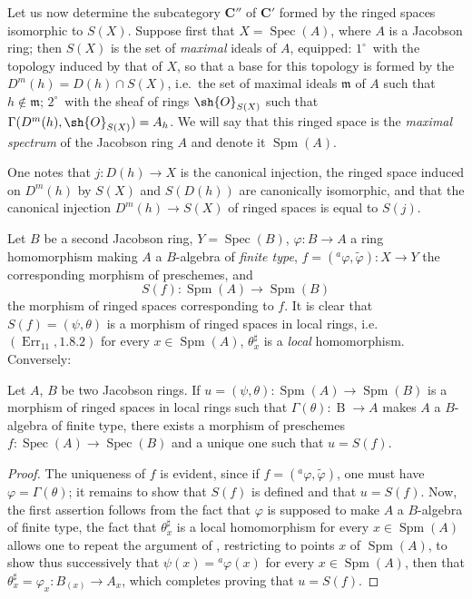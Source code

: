 \begin{env}[10.9.3]
\label{IV.10.9.3}
Let us now determine the subcategory $\mathbf{C}''$ of $\mathbf{C}'$ formed by the ringed spaces isomorphic to $S(X)$.
Suppose first that $X=\operatorname{Spec}(A)$, where $A$ is a Jacobson ring; then $S(X)$ is the set of \emph{maximal} ideals of $A$, equipped: $1^\circ$~with the topology induced by that of $X$, so that a base for this topology is formed by the $D^m(h)=D(h)\cap S(X)$, i.e.\ the set of maximal ideals $\mathfrak{m}$ of $A$ such that $h\notin\mathfrak{m}$; $2^\circ$~with the sheaf of rings $\sh{O}_{S(X)}$ such that $\Gamma(D^m(h),\sh{O}_{S(X)})=A_h$.
We will say that this ringed space is the \emph{maximal spectrum} of the Jacobson ring $A$ and denote it $\operatorname{Spm}(A)$.

One notes that $j:D(h)\to X$ is the canonical injection, the ringed space induced on $D^m(h)$ by $S(X)$ and $S(D(h))$ are canonically isomorphic, and that the canonical injection $D^m(h)\to S(X)$ of ringed spaces is equal to $S(j)$.

Let $B$ be a second Jacobson ring, $Y=\operatorname{Spec}(B)$, $\varphi:B\to A$ a ring homomorphism making $A$ a $B$-algebra of \emph{finite type}, $f=({}^a\varphi,\widetilde{\varphi}):X\to Y$ the corresponding morphism of preschemes, and
\[
  S(f):\operatorname{Spm}(A)\to\operatorname{Spm}(B)
\]
the morphism of ringed spaces corresponding to $f$.
It is clear that $S(f)=(\psi,\theta)$ is a morphism of ringed spaces in local rings, i.e.\ $(\operatorname{Err}_{11},1.8.2)$ for every $x\in\operatorname{Spm}(A)$, $\theta^\sharp_x$ is a \emph{local} homomorphism.
Conversely:
\end{env}

\begin{proposition}[10.9.4]
\label{IV.10.9.4}
Let $A$, $B$ be two Jacobson rings.
If $u=(\psi,\theta):\operatorname{Spm}(A)\to\operatorname{Spm}(B)$ is a morphism of ringed spaces in local rings such that $\Gamma(\theta):\operatorname{B}\to A$ makes $A$ a $B$-algebra of finite type, there exists a morphism of preschemes $f:\operatorname{Spec}(A)\to\operatorname{Spec}(B)$ and a unique one such that $u=S(f)$.
\end{proposition}

\begin{proof}
The uniqueness of $f$ is evident, since if $f=({}^a\varphi,\widetilde{\varphi})$, one must have $\varphi=\Gamma(\theta)$; it remains to show that $S(f)$ is defined and that $u=S(f)$.
Now, the first assertion follows from the fact that $\varphi$ is supposed to make $A$ a $B$-algebra of finite type, the fact that $\theta^\sharp_x$ is a local homomorphism for every $x\in\operatorname{Spm}(A)$ allows one to repeat the argument of , restricting to points $x$ of $\operatorname{Spm}(A)$, to show thus successively that $\psi(x)={}^a\varphi(x)$ for every $x\in\operatorname{Spm}(A)$, then that $\theta^\sharp_x=\varphi_x:B_{(x)}\to A_x$, which completes proving that $u=S(f)$.
\end{proof}

